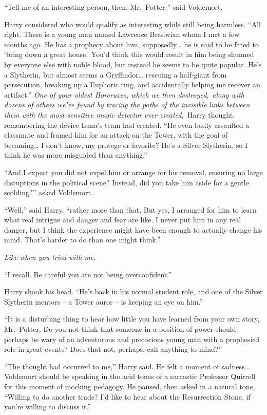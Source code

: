 ``Tell me of an interesting person, then, Mr.~Potter,'' said Voldemort.

Harry considered who would qualify as interesting while still being
harmless. ``All right. There is a young man named Lawrence Bradwian whom
I met a few months ago. He has a prophecy about him, supposedly\ldots{}
he is said to be fated to `bring down a great house.' You'd think this
would result in him being shunned by everyone else with noble blood, but
instead he seems to be quite popular. He's a Slytherin, but almost seems
a Gryffindor\ldots{} rescuing a half-giant from persecution, breaking up
a Euphoric ring, and accidentally helping me recover an artifact.''
\emph{One of your oldest Horcruxes, which we then
destroyed},~\emph{along with dozens of others we've found by tracing the
paths of the invisible links between them with the most sensitive magic
detector ever created,}~Harry thought, remembering the device Luna's
team had created. ``He even badly assaulted a classmate and framed him
for an attack on the Tower, with the goal of becoming\ldots{} I don't
know, my protege or favorite? He's a Silver Slytherin, so I think he was
more misguided than anything.''

``And I expect you did not expel him or arrange for his removal,
ensuring no large disruptions in the political scene? Instead, did you
take him aside for a gentle scolding?'' asked Voldemort.

``Well,'' said Harry, ``rather more than that. But yes, I arranged for
him to learn what real intrigue and danger and fear are like. I never
put him in any real danger, but I think the experience might have been
enough to actually change his mind. That's harder to do than one might
think.''

\emph{Like when you tried with me.}

``I recall. Be careful you are not being overconfident.''

Harry shook his head. ``He's back in his normal student role, and one of
the Silver Slytherin mentors -- a Tower auror -- is keeping an eye on
him.''

``It is a disturbing thing to hear how little you have learned from your
own story, Mr.~Potter. Do you not think that someone in a position of
power should perhaps be wary of an adventurous and precocious young man
with a prophesied role in great events? Does that not, perhaps, call
anything to mind?''

``The thought had occurred to me,'' Harry said. He felt a moment of
sadness\ldots{} Voldemort should be speaking in the acid tones of a
sarcastic Professor Quirrell for this moment of mocking pedagogy. He
paused, then asked in a natural tone, ``Willing to do another trade? I'd
like to hear about the Resurrection Stone, if you're willing to discuss
it.''

